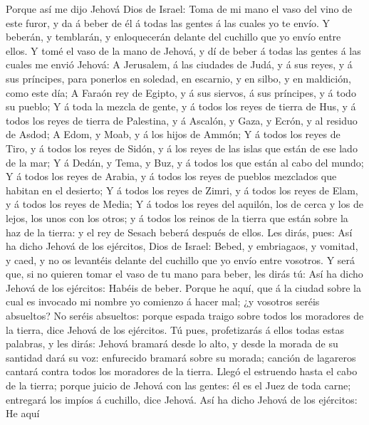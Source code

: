  Porque así me dijo Jehová Dios de Israel: Toma de mi mano
el vaso del vino de este furor, y da á beber de él á todas las gentes á
las cuales yo te envío.  Y beberán, y temblarán, y
enloquecerán delante del cuchillo que yo envío entre ellos.
 Y tomé el vaso de la mano de Jehová, y dí de beber á todas
las gentes á las cuales me envió Jehová:  A Jerusalem, á
las ciudades de Judá, y á sus reyes, y á sus príncipes, para ponerlos en
soledad, en escarnio, y en silbo, y en maldición, como este día;
 A Faraón rey de Egipto, y á sus siervos, á sus príncipes,
y á todo su pueblo;  Y á toda la mezcla de gente, y á todos
los reyes de tierra de Hus, y á todos los reyes de tierra de Palestina,
y á Ascalón, y Gaza, y Ecrón, y al residuo de Asdod;  A
Edom, y Moab, y á los hijos de Ammón;  Y á todos los reyes
de Tiro, y á todos los reyes de Sidón, y á los reyes de las islas que
están de ese lado de la mar;  Y á Dedán, y Tema, y Buz, y á
todos los que están al cabo del mundo;  Y á todos los reyes
de Arabia, y á todos los reyes de pueblos mezclados que habitan en el
desierto;  Y á todos los reyes de Zimri, y á todos los
reyes de Elam, y á todos los reyes de Media;  Y á todos los
reyes del aquilón, los de cerca y los de lejos, los unos con los otros;
y á todos los reinos de la tierra que están sobre la haz de la tierra: y
el rey de Sesach beberá después de ellos.  Les dirás, pues:
Así ha dicho Jehová de los ejércitos, Dios de Israel: Bebed, y
embriagaos, y vomitad, y caed, y no os levantéis delante del cuchillo
que yo envío entre vosotros.  Y será que, si no quieren
tomar el vaso de tu mano para beber, les dirás tú: Así ha dicho Jehová
de los ejércitos: Habéis de beber.  Porque he aquí, que á
la ciudad sobre la cual es invocado mi nombre yo comienzo á hacer mal;
¿y vosotros seréis absueltos? No seréis absueltos: porque espada traigo
sobre todos los moradores de la tierra, dice Jehová de los ejércitos.
 Tú pues, profetizarás á ellos todas estas palabras, y les
dirás: Jehová bramará desde lo alto, y desde la morada de su santidad
dará su voz: enfurecido bramará sobre su morada; canción de lagareros
cantará contra todos los moradores de la tierra.  Llegó el
estruendo hasta el cabo de la tierra; porque juicio de Jehová con las
gentes: él es el Juez de toda carne; entregará los impíos á cuchillo,
dice Jehová.  Así ha dicho Jehová de los ejércitos: He aquí
